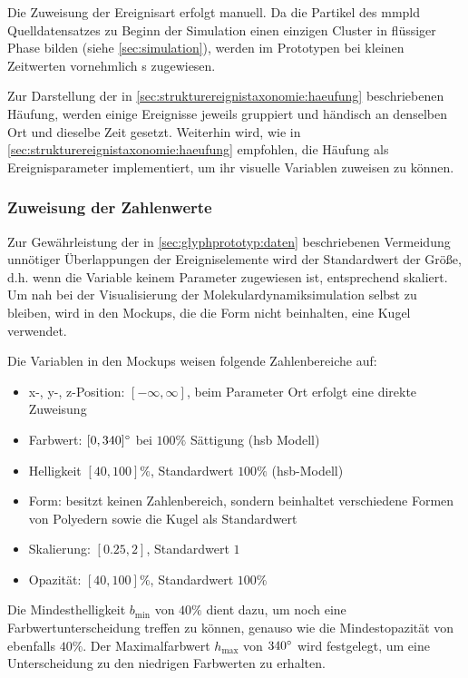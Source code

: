 Die Zuweisung der Ereignisart erfolgt manuell. Da die Partikel des \gls{mmpld} Quelldatensatzes zu Beginn der Simulation einen einzigen Cluster in flüssiger Phase bilden (siehe \autoref{sec:simulation}), werden im Prototypen bei kleinen Zeitwerten vornehmlich s zugewiesen.

Zur Darstellung der in \autoref{sec:strukturereignistaxonomie:haeufung} beschriebenen Häufung, %
werden einige Ereignisse jeweils gruppiert und händisch an denselben Ort und dieselbe Zeit gesetzt. Weiterhin wird, wie in \autoref{sec:strukturereignistaxonomie:haeufung} empfohlen, die Häufung als Ereignisparameter implementiert, um ihr visuelle Variablen zuweisen zu können.

\subsubsection*{Zuweisung der Zahlenwerte}
Zur Gewährleistung der in \autoref{sec:glyphprototyp:daten} beschriebenen Vermeidung unnötiger Überlappungen der Ereigniselemente wird der Standardwert der  Größe, d.h. wenn die Variable keinem Parameter zugewiesen ist, entsprechend skaliert. Um nah bei der Visualisierung der Molekulardynamiksimulation selbst zu bleiben, wird in den Mockups, die die  Form nicht beinhalten, eine Kugel verwendet. 

Die Variablen in den Mockups weisen folgende Zahlenbereiche auf:
\begin{itemize}
	\item x-, y-, z-Position: $[-\infty, \infty]$, beim Parameter Ort erfolgt eine direkte Zuweisung 
	\item Farbwert: $[0, 340]\degree$ bei $100\%$ Sättigung (\gls{hsb} Modell)
	\item Helligkeit $[40, 100]\%$, Standardwert $100\%$ (\gls{hsb}-Modell)
	\item Form: besitzt keinen Zahlenbereich, sondern beinhaltet verschiedene Formen von Polyedern sowie die Kugel als Standardwert
	\item Skalierung: $[0.25,2]$, Standardwert $1$
	\item Opazität: $[40, 100]\%$, Standardwert $100\%$
\end{itemize}
Die Mindesthelligkeit $b_{\text{min}}$ von $40\%$ dient dazu, um noch eine Farbwertunterscheidung treffen zu können, genauso wie die Mindestopazität von ebenfalls $40\%$. Der Maximalfarbwert $h_{\text{max}}$ von $340\degree$ wird festgelegt, um eine Unterscheidung zu den niedrigen Farbwerten zu erhalten.


